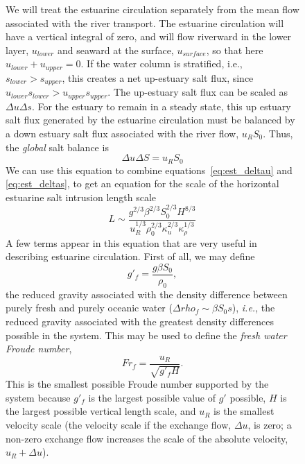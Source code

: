 \documentclass[11pt]{report}
\numberwithin{equation}{section}
\begin{document}
\begin{figure}
We will treat the estuarine circulation separately from the mean flow associated with the river transport.  The estuarine circulation will have a vertical integral of zero, and will flow riverward in the lower layer, $u_{lower}$ and seaward at the surface, $u_{surface}$, so that here $u_{lower} + u_{upper} = 0$.  If the water column is stratified, i.e., $s_{lower} > s_{upper}$, this creates a net up-estuary salt flux, since $u_{lower} s_{lower} > u_{upper} s_{upper}$.  The up-estuary salt flux can be scaled as $\Delta u \Delta s$.  For the estuary to remain in a steady state, this up estuary salt flux generated by the estuarine circulation must be balanced by a down estuary salt flux associated with the river flow, $u_R S_0$.  Thus, the \emph{global} salt balance is
\begin{equation}
    \Delta u \Delta S = u_R S_0
\end{equation}
We can use this equation to combine equations~\ref{eq:est_deltau} and \ref{eq:est_deltas}, to get an equation for the scale of the horizontal estuarine salt intrusion length scale
\begin{equation}
    L \sim \frac{g^{2/3} \beta^{2/3} S_0^{2/3} H^{8/3}}{u_R^{1/3} \rho_0^{2/3} \kappa_u^{2/3} \kappa_\rho^{1/3} }
\end{equation}
A few terms appear in this equation that are very useful in describing estuarine circulation.  First of all, we may define
\begin{equation}
    g'_f = \frac{g \beta S_0}{\rho_0},
\end{equation}
the reduced gravity associated with the density difference between purely fresh and purely oceanic water ($\Delta rho_f \sim \beta S_0s$), \emph{i.e.}, the reduced gravity associated with the greatest density differences possible in the system.  This may be used to define the \emph{fresh water Froude number},
\begin{equation}
    Fr_f = \frac{u_R}{\sqrt{g'_f H}}.
\end{equation}
This is the smallest possible Froude number supported by the system because $g'_f$ is the largest possible value of $g'$ possible, $H$ is the largest possible vertical length scale, and $u_R$ is the smallest velocity scale (the velocity scale if the exchange flow, $\Delta u$, is zero; a non-zero exchange flow increases the scale of the absolute velocity, $u_R + \Delta u$).  


\end{figure}
\end{document}
